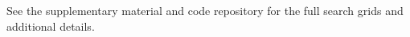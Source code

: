 
\noindent
See the supplementary material and code repository for the full search grids and additional details.


